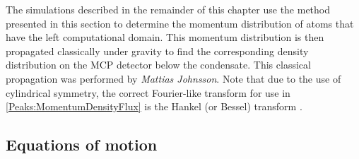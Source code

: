 \parasep

The simulations described in the remainder of this chapter use the method presented in this section to determine the momentum distribution of atoms that have the left computational domain. This momentum distribution is then propagated classically under gravity to find the corresponding density distribution on the MCP detector below the condensate. This classical propagation was performed by \emph{Mattias Johnsson}. Note that due to the use of cylindrical symmetry, the correct Fourier-like transform for use in \eqref{Peaks:MomentumDensityFlux} is the Hankel (or Bessel) transform \citep{ArfkenWeber}.

\subsection{Equations of motion}
\label{Peaks:3DEquationsOfMotion}


